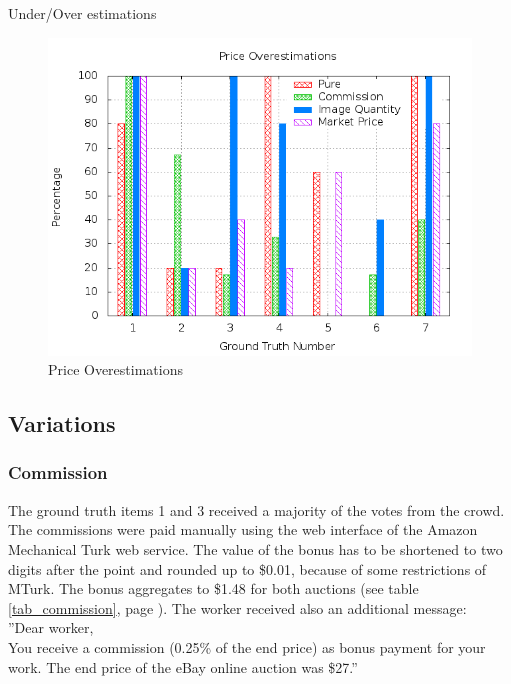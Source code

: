 Under/Over estimations
\begin{figure}
\centering
\includegraphics[scale=0.55]{images/plots/crowdsourcing/plot_price_overestimation.png}
\caption{Price Overestimations}
\label{crowdsourcing_price_overestimations}
\end{figure}
\subsection{Variations}
\subsubsection{Commission}
The ground truth items 1 and 3 received a majority of the votes from the crowd. The commissions were paid manually using the web interface of the Amazon Mechanical Turk web service. The value of the bonus has to be shortened to two digits after the point and rounded up to \$0.01, because of some restrictions of MTurk. The bonus aggregates to \$1.48 for both auctions (see table \ref{tab_commission}, page \pageref{tab_commission}). The worker received also an additional message: \\
''Dear worker, \\

You receive a commission (0.25\% of the end price) as bonus payment for your work. The end price of the eBay online auction was \$27.''

